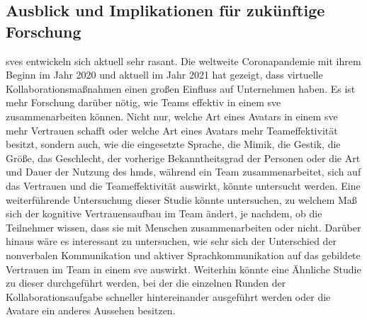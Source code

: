 \documentclass[a4paper,11pt]{article}%
\renewcommand{\\}{\vspace*{0.5\baselineskip} \newline}
\begin{document}
\subsection{Ausblick und Implikationen für zukünftige Forschung}
\ac{sve}s entwickeln sich aktuell sehr rasant. Die weltweite Coronapandemie mit ihrem Beginn im Jahr 2020 und aktuell im Jahr 2021 hat gezeigt, dass virtuelle Kollaborationsmaßnahmen einen großen Einfluss auf Unternehmen haben. Es ist mehr Forschung darüber nötig, wie Teams effektiv in einem \ac{sve} zusammenarbeiten können. Nicht nur, welche Art eines Avatars in einem \ac{sve} mehr Vertrauen schafft oder welche Art eines Avatars mehr Teameffektivität besitzt, sondern auch, wie die eingesetzte Sprache, die Mimik, die Gestik, die Größe, das Geschlecht, der vorherige Bekanntheitsgrad der Personen oder die Art und Dauer der Nutzung des \ac{hmd}s, während ein Team zusammenarbeitet, sich auf das Vertrauen und die Teameffektivität auswirkt, könnte untersucht werden. Eine weiterführende Untersuchung dieser Studie könnte untersuchen, zu welchem Maß sich der kognitive Vertrauensaufbau im Team ändert, je nachdem, ob die Teilnehmer wissen, dass sie mit Menschen zusammenarbeiten oder nicht. Darüber hinaus wäre es interessant zu untersuchen, wie sehr sich der Unterschied der nonverbalen Kommunikation und aktiver Sprachkommunikation auf das gebildete Vertrauen im Team in einem \ac{sve} auswirkt.  
Weiterhin könnte eine Ähnliche Studie zu dieser durchgeführt werden, bei der die einzelnen Runden der Kollaborationsaufgabe schneller hintereinander ausgeführt werden oder die Avatare ein anderes Aussehen besitzen.

%
%
%
\clearpage
\newpage
\end{document}
